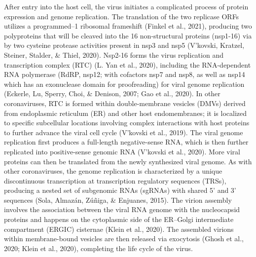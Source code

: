 \documentclass[12pt,twoside,openany,\mydriver]{thesis}  %
\begin{document}
After entry into the host cell, the virus initiates a complicated process of protein expression and genome replication. The translation of the two replicase ORFs utilizes a programmed--1 ribosomal frameshift (Finkel et al., 2021), producing two polyproteins that will be cleaved into the 16 non-structural proteins (nsp1-16) via by two cysteine protease activities present in nsp3 and nsp5 (V'kovski, Kratzel, Steiner, Stalder, \& Thiel, 2020). Nsp2-16 forms the virus replication and transcription complex (RTC) (L. Yan et al., 2020), including the RNA-dependent RNA polymerase (RdRP, nsp12; with cofactors nsp7 and nsp8, as well as nsp14 which has an exonuclease domain for proofreading) for viral genome replication (Eckerle, Lu, Sperry, Choi, \& Denison, 2007; Gao et al., 2020). In other coronaviruses, RTC is formed within double-membrane vesicles (DMVs) derived from endoplasmic reticulum (ER) and other host endomembranes; it is localized to specific subcellular locations involving complex interactions with host proteins to further advance the viral cell cycle (V'kovski et al., 2019). The viral genome replication first produces a full-length negative-sense RNA, which is then further replicated into positive-sense genomic RNA (V'kovski et al., 2020). More viral proteins can then be translated from the newly synthesized viral genome. As with other coronaviruses, the genome replication is characterized by a unique discontinuous transcription at transcription regulatory sequences (TRSs), producing a nested set of subgenomic RNAs (sgRNAs) with shared 5' and 3' sequences (Sola, Almazán, Zúñiga, \& Enjuanes, 2015). The virion assembly involves the association between the viral RNA genome with the nucleocapsid proteins and happens on the cytoplasmic side of the ER--Golgi intermediate compartment (ERGIC) cisternae (Klein et al., 2020). The assembled virions within membrane-bound vesicles are then released via exocytosis (Ghosh et al., 2020; Klein et al., 2020), completing the life cycle of the virus.
\end{document}
